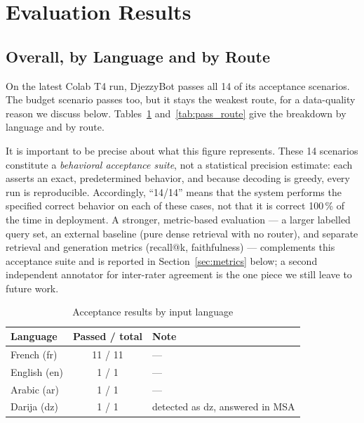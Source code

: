 \documentclass[12pt, a4paper]{report}
\newcommand{\humantext}[1]{#1}      %
\newcommand{\numTestsPass}{14}\newcommand{\numTestsTotal}{14}\newcommand{\numDeepUrls}{131}
\begin{document}
\section{Evaluation Results}

\subsection{Overall, by Language and by Route}
\humantext{On the latest Colab T4 run, DjezzyBot passes all \numTestsTotal{} of its acceptance scenarios. The budget scenario passes too, but it stays the weakest route, for a data-quality reason we discuss below. Tables~\ref{tab:pass_lang} and~\ref{tab:pass_route} give the breakdown by language and by route.}

\humantext{It is important to be precise about what this figure represents. These \numTestsTotal{} scenarios constitute a \emph{behavioral acceptance suite}, not a statistical precision estimate: each asserts an exact, predetermined behavior, and because decoding is greedy, every run is reproducible. Accordingly, ``\numTestsPass{}/\numTestsTotal{}'' means that the system performs the specified correct behavior on each of these cases, not that it is correct 100\,\% of the time in deployment. A stronger, metric-based evaluation --- a larger labelled query set, an external baseline (pure dense retrieval with no router), and separate retrieval and generation metrics (recall@k, faithfulness) --- complements this acceptance suite and is reported in Section~\ref{sec:metrics} below; a second independent annotator for inter-rater agreement is the one piece we still leave to future work.}

\begin{table}[H]
\centering
\caption{Acceptance results by input language}
\label{tab:pass_lang}
\begin{tabularx}{\textwidth}{l c X}
\toprule
\textbf{Language} & \textbf{Passed / total} & \textbf{Note} \\
\midrule
French (fr)  & 11 / 11 & --- \\
English (en) & 1 / 1   & --- \\
Arabic (ar)  & 1 / 1   & --- \\
Darija (dz)  & 1 / 1   & detected as dz, answered in MSA \\
\bottomrule
\end{tabularx}
\end{table}
\end{document}
